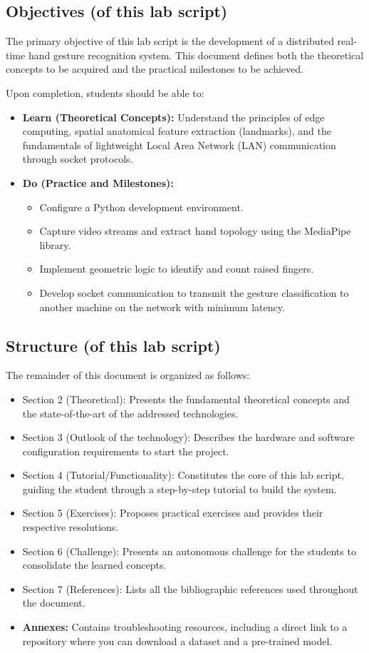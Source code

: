 \subsection{Objectives (of this lab script)}

The primary objective of this lab script is the development of a distributed real-time hand gesture recognition system. This document defines both the theoretical concepts to be acquired and the practical milestones to be achieved.

Upon completion, students should be able to:
\begin{itemize}
    \item \textbf{Learn (Theoretical Concepts):} Understand the principles of edge computing, spatial anatomical feature extraction (landmarks), and the fundamentals of lightweight Local Area Network (LAN) communication through socket protocols.
    \item \textbf{Do (Practice and Milestones):}
    \begin{itemize}
        \item Configure a Python development environment.
        \item Capture video streams and extract hand topology using the MediaPipe library.
        \item Implement geometric logic to identify and count raised fingers.
        \item Develop socket communication to transmit the gesture classification to another machine on the network with minimum latency.
    \end{itemize}
\end{itemize}

\subsection{Structure (of this lab script)}

The remainder of this document is organized as follows:
\begin{itemize}
    \item Section 2 (Theoretical): Presents the fundamental theoretical concepts and the state-of-the-art of the addressed technologies.
    \item Section 3 (Outlook of the technology): Describes the hardware and software configuration requirements to start the project.
    \item Section 4 (Tutorial/Functionality): Constitutes the core of this lab script, guiding the student through a step-by-step tutorial to build the system.
    \item Section 5 (Exercises): Proposes practical exercises and provides their respective resolutions.
    \item Section 6 (Challenge): Presents an autonomous challenge for the students to consolidate the learned concepts.
    \item Section 7 (References): Lists all the bibliographic references used throughout the document.
    \item \textbf{Annexes:} Contains troubleshooting resources, including a direct link to a repository where you can download a dataset and a pre-trained model.
\end{itemize}